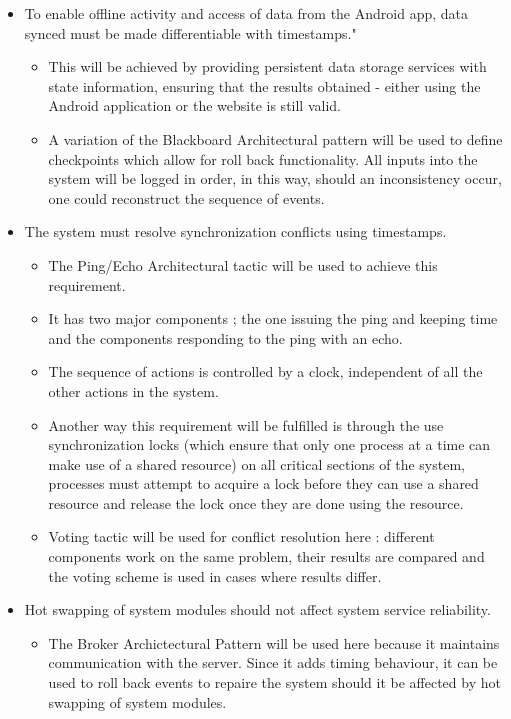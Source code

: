 \documentclass[a4paper,10pt]{article}
\begin{document}
		\begin{itemize}
			\item To enable offline activity and access of data from the Android app, data synced must be made differentiable with timestamps."\\
				\begin{itemize}
					\item This will be achieved by providing persistent data storage services with state information, ensuring that the results obtained - either using the Android application or the website is still valid.  
					\item A variation of the Blackboard Architectural pattern will be used to define checkpoints which allow for roll back functionality. All inputs into the system will be logged in order, in this way, should an inconsistency occur, one could reconstruct the sequence of events. 
				\end{itemize}
			\item The system must resolve synchronization conflicts using timestamps.
				\begin{itemize}
					\item The Ping/Echo Architectural tactic will be used to achieve this requirement. 
					\item It has two major components ; the one issuing the ping and keeping time and the components responding to the ping with an echo. 
					\item The sequence of actions is controlled by a clock, independent of all the other actions in the system. 
					\item Another way this requirement will be fulfilled is through the use synchronization locks (which ensure that only one process at a time can make use of a shared resource) on all critical sections of the system, processes must attempt to acquire a lock before they can use a shared resource and release the lock once they are done using the resource.
					\item Voting tactic will be used for conflict resolution here : different components work on the same problem, their results are compared and the voting scheme is used in cases where results differ.
				\end{itemize}
			\item Hot swapping of system modules should not affect system service reliability.
				\begin{itemize}
					\item The Broker Archictectural Pattern will be used here because it maintains communication with the server. Since it adds timing behaviour, it can be used to roll back events to repaire the system should it be affected by hot swapping of system modules. 

\end{itemize}
\end{itemize}
\end{document}
